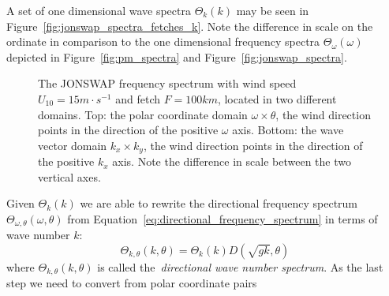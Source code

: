 %
A set of one dimensional wave spectra $\Theta_k(k)$ may be seen in
Figure~\ref{fig:jonswap_spectra_fetches_k}. Note the difference in scale on the ordinate
in comparison to the one dimensional frequency spectra $\Theta_{\omega}(\omega)$
depicted in Figure~\ref{fig:pm_spectra} and Figure~\ref{fig:jonswap_spectra}.\\

%
\begin{figure}
\centering
\subbottom
{
\label{sfig:polar}
}
\subbottom
{
\label{sfig:wave_vector}
}
\caption{The JONSWAP frequency spectrum with wind speed $U_{10} = 15m\cdot 
s^{-1}$ and fetch $F = 100km$, located in two different domains. Top: the polar
coordinate domain $\omega \times \theta$, the wind direction points in the
direction of the positive $\omega$ axis. Bottom: the wave vector domain
$k_x \times k_y$, the wind direction points in the direction of the positive
$k_x$ axis. Note the difference in scale between the two vertical axes.}
\label{fig:jonswap_3d_omega_theta_kx_ky}
\end{figure}
%
Given $\Theta_k(k)$ we are able to rewrite the directional frequency spectrum
$\Theta_{\omega, \theta}(\omega, \theta)$ from
Equation~\ref{eq:directional_frequency_spectrum} in terms of wave number $k$:
%
\begin{equation}
\label{eq:theta_k_polar}
 \Theta_{k,\theta}(k,\theta) = \Theta_k(k)D(\sqrt{gk},\theta)
\end{equation}
%
where $\Theta_{k,\theta}(k,\theta)$ is called the~\emph{directional wave number 
spectrum}. As the last step we need to convert from polar coordinate pairs 
